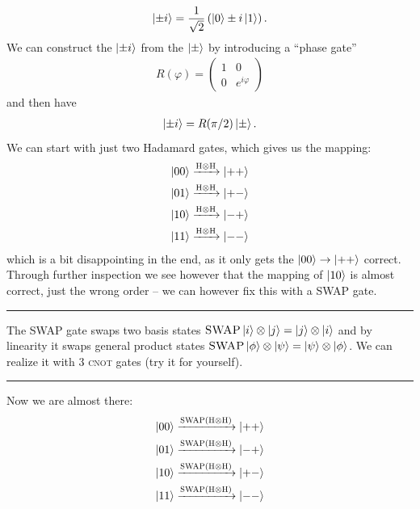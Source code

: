 \begin{align}
    \ket{\pm i} = \frac{1}{\sqrt{2}}\left(\ket{0} \pm i \ket{1} \right).
\end{align}
We can construct the $\ket{\pm i}$ from the $\ket{\pm}$ by introducing a ``phase gate'' 
\begin{align}
    R(\varphi) = \begin{pmatrix}
        1 & 0 \\ 0 & e^{i\varphi}
    \end{pmatrix}
\end{align}
and then have
\begin{align}
    \ket{\pm i} = R(\pi/2) \ket{\pm}.
\end{align}
We can start with just two Hadamard gates, which gives us the mapping:
\begin{align}
    \ket{00} &\xrightarrow{\text{\normalfont\scshape H}\otimes \text{\normalfont\scshape H}} \ket{++} \\
    \ket{01} &\xrightarrow{\text{\normalfont\scshape H}\otimes \text{\normalfont\scshape H}} \ket{+-} \\
    \ket{10} &\xrightarrow{\text{\normalfont\scshape H}\otimes \text{\normalfont\scshape H}} \ket{-+} \\
    \ket{11} &\xrightarrow{\text{\normalfont\scshape H}\otimes \text{\normalfont\scshape H}} \ket{--} \\
\end{align}
which is a bit disappointing in the end, as it only gets the $\ket{00} \rightarrow \ket{++}$ correct. Through further inspection we see however that the mapping of $\ket{10}$ is almost correct, just the wrong order -- we can however fix this with a \textsc{SWAP} gate.
\vspace{0.25cm}
\noindent\rule{\textwidth}{0.4pt}
\vspace{0.25cm}
The SWAP gate swaps two basis states $\textsc{SWAP}\ket{i}\otimes\ket{j} = \ket{j}\otimes\ket{i}$ and by linearity it swaps general product states $\textsc{SWAP}\ket{\phi}\otimes\ket{\psi} = \ket{\psi}\otimes\ket{\phi}$. We can realize it with 3 \textsc{cnot} gates (try it for yourself).
\vspace{0.25cm}
\noindent\rule{\textwidth}{0.4pt}
\vspace{0.25cm}
Now we are almost there:
\begin{align}
    \ket{00} &\xrightarrow{\textsc{SWAP}\left(\text{\normalfont\scshape H}\otimes \text{\normalfont\scshape H}\right)} \ket{++} \\
    \ket{01} &\xrightarrow{\textsc{SWAP}\left(\text{\normalfont\scshape H}\otimes \text{\normalfont\scshape H}\right)} \ket{-+} \\
    \ket{10} &\xrightarrow{\textsc{SWAP}\left(\text{\normalfont\scshape H}\otimes \text{\normalfont\scshape H}\right)} \ket{+-} \\
    \ket{11} &\xrightarrow{\textsc{SWAP}\left(\text{\normalfont\scshape H}\otimes \text{\normalfont\scshape H}\right)} \ket{--} \\
\end{align}
